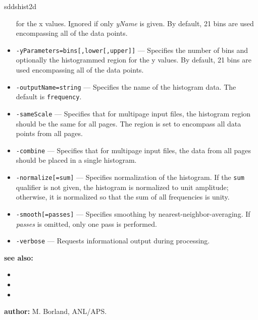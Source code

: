 \begin{sddsprog}{sddshist2d}
\begin{itemize}
        for the x values. Ignored if only {\em yName} is given. By default, 21 bins are used encompassing all of the data points.
      \item \verb|-yParameters=bins[,lower[,upper]]| --- Specifies the number of bins and optionally the histogrammed region
        for the y values. By default, 21 bins are used encompassing all of the data points.
      \item \verb|-outputName=string| --- Specifies the name of the histogram data. The default is \verb|frequency|.
      \item \verb|-sameScale| --- Specifies that for multipage input files, the histogram region should be the same for all pages.
        The region is set to encompass all data points from all pages.
      \item \verb|-combine| --- Specifies that for multipage input files, the data from all pages should be placed in a single histogram.
      \item \verb|-normalize[=sum]| --- Specifies normalization of the histogram. If the \verb|sum| qualifier is not given,
        the histogram is normalized to unit amplitude; otherwise, it is normalized so that the sum of all frequencies is unity.
      \item \verb|-smooth[=passes]| --- Specifies smoothing by nearest-neighbor-averaging. If {\em passes} is omitted, only one pass is performed.
      \item \verb|-verbose| --- Requests informational output during processing.
    \end{itemize}
  \item \textbf{see also:}
    \begin{itemize}
      \item {}
      \item {}
      \item {}
    \end{itemize}
  \item \textbf{author:} M. Borland, ANL/APS.
\end{sddsprog}

